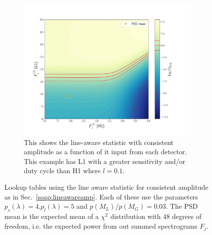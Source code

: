 \begin{figure}
\begin{subfigure}[h]{\linewidth}
\begin{minipage}{0.65\linewidth}
\includegraphics[width=0.9\columnwidth]{C3_soap/lookup_3d_0.pdf}
\end{minipage}\hfill
\begin{minipage}{0.35\linewidth}
\caption{This shows the line-aware statistic with consistent amplitude as a function of it input from each detector. This example has L1 with a greater sensitivity and/or duty cycle than H1 where $l=0.1$.}
\label{soap:lineawareamp:plot:linebig}
\end{minipage}
\end{subfigure}
\caption[Lookup tables for line aware statistic with consistent amplitude.]{Lookup tables using the line aware statistic for consistent amplitude as in Sec.~\ref{soap:lineawareamp}. Each of these use the parameters $p_s(\lambda) = 4$,$p_l(\lambda) = 5$ and $p(M_L)/p(M_G) = 0.03$. The \gls{PSD} mean is the expected mean of a $\chi^2$ distribution with 48 degrees of freedom, i.e. the expected power from out summed spectrograms $F_j$. }
\label{soap:lineawareamp:example}
\end{figure}

